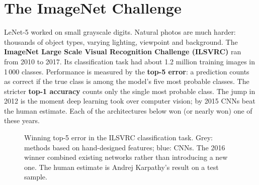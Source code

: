 \documentclass[12pt, a4paper]{article}
\begin{document}
\section{The ImageNet Challenge}

LeNet-5 worked on small grayscale digits. Natural photos are much harder:
thousands of object types, varying lighting, viewpoint and background.
The \textbf{ImageNet Large Scale Visual Recognition Challenge (ILSVRC)} ran
from 2010 to 2017. Its classification task had about 1.2 million training
images in 1\,000 classes. Performance is measured by the \textbf{top-5 error}:
a prediction counts as correct if the true class is among the model's five
most probable classes. The stricter \textbf{top-1 accuracy} counts only the
single most probable class. The jump in 2012 is the moment deep learning took
over computer vision; by 2015 CNNs beat the human estimate. Each of the
architectures below won (or nearly won) one of these years.

\begin{figure}[H]
  \centering
  \caption{Winning top-5 error in the ILSVRC classification task. Grey: methods
    based on hand-designed features; blue: CNNs. The 2016 winner combined
    existing networks rather than introducing a new one. The human estimate is
    Andrej Karpathy's result on a test sample.}
  \label{fig:ilsvrc}
\end{figure}
\end{document}
